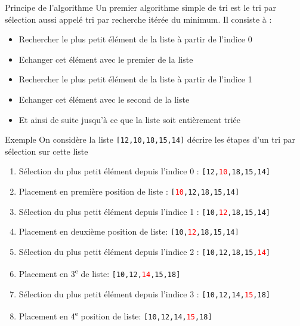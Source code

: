 \documentclass[10pt]{beamer}
\begin{document}
\begin{frame}{\Ctitle}{\stitle}
	\begin{alertblock}{Principe de l'algorithme}
		Un premier algorithme simple de tri est le tri par sélection aussi appelé tri par recherche itérée du minimum. Il consiste à :
		\begin{itemize}
			\item<1-> Rechercher le plus petit élément de la liste à partir de l'indice 0
			\item<2-> Echanger cet élément avec le premier de la liste
			\item<3-> Rechercher le plus petit élément de la liste à partir de l'indice 1
			\item<4-> Echanger cet élément avec le second de la liste
			\item<5-> Et ainsi de suite jusqu'à ce que la liste soit entièrement triée
		\end{itemize}
	\end{alertblock}
\end{frame}


\begin{frame}{\Ctitle}{\stitle}
	\begin{exampleblock}{Exemple}
		On considère la liste \texttt{[12,10,18,15,14]} décrire les étapes d'un tri par sélection sur cette liste
		\begin{enumerate}
			\item<2->{Sélection du plus petit élément depuis l'indice 0 : \texttt{[12,\textcolor{red}{10},18,15,14]}}
			\item<3->{Placement en première position de liste : \texttt{[\textcolor{red}{10},12,18,15,14]}}
			\item<4->{Sélection du plus petit élément depuis l'indice 1 : \texttt{[10,\textcolor{red}{12},18,15,14]}}
			\item<5->{Placement en deuxième position de liste: \texttt{[10,\textcolor{red}{12},18,15,14]}}
			\item<6->{Sélection du plus petit élément depuis l'indice 2 : \texttt{[10,12,18,15,\textcolor{red}{14}]}}
			\item<7->{Placement en 3\textsuperscript{e} de liste: \texttt{[10,12,\textcolor{red}{14},15,18]}}
			\item<8->{Sélection du plus petit élément depuis l'indice 3 : \texttt{[10,12,14,\textcolor{red}{15},18]}}
			\item<9->{Placement en 4\textsuperscript{e} position de liste: \texttt{[10,12,14,\textcolor{red}{15},18]}}
		\end{enumerate}
	\end{exampleblock}
\end{frame}
\end{document}
